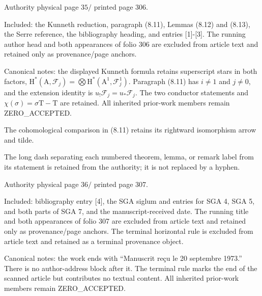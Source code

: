 \documentclass[10pt,leqno]{article}
\begin{document}
\label{physical-35}\par\smallskip

\noindent Authority physical page \(35 /\) printed page 306.\par

\noindent Included: the Kunneth reduction, paragraph (8.11), Lemmas (8.12) and (8.13), the Serre reference, the bibliography heading, and entries [1]-[3]. The running author head and both appearances of folio 306 are excluded from article text and retained only as provenance/page anchors.\par

\noindent Canonical notes: the displayed Kunneth formula retains superscript stars in both factors, \(\mathrm{H}^{*}(\mathrm{A},\mathcal{F} _{j})=\bigotimes\mathrm{H}^{*}(\mathrm{A}^{1},\mathcal{F} _{j}^{1})\). Paragraph (8.11) has \(i\ne 1\) and \(j\ne 0\), and the extension identity is \(u_{!}\mathcal{F} _{j}=u_{*}\mathcal{F} _{j}\). The two conductor statements and \(\chi (\sigma )=\sigma \mathrm{T}-\mathrm{T}\) are retained. All inherited prior-work members remain ZERO\_ACCEPTED.\par

\noindent The cohomological comparison in (8.11) retains its rightward isomorphism arrow and tilde.\par

\noindent The long dash separating each numbered theorem, lemma, or remark label from its statement is retained from the authority; it is not replaced by a hyphen.\par

\clearpage

\label{physical-36}\par\smallskip

\noindent Authority physical page \(36 /\) printed page 307.\par

\noindent Included: bibliography entry [4], the SGA siglum and entries for SGA 4, SGA 5, and both parts of SGA 7, and the manuscript-received date. The running title and both appearances of folio 307 are excluded from article text and retained only as provenance/page anchors. The terminal horizontal rule is excluded from article text and retained as a terminal provenance object.\par

\noindent Canonical notes: the work ends with “Manuscrit reçu le 20 septembre 1973.” There is no author-address block after it. The terminal rule marks the end of the scanned article but contributes no textual content. All inherited prior-work members remain ZERO\_ACCEPTED.\par

\clearpage
\end{document}
